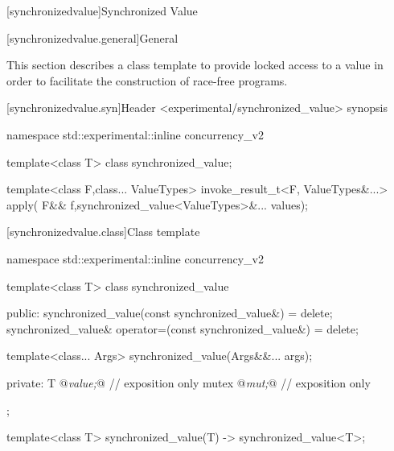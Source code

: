 \setcounter{chapter}{7}
[synchronizedvalue]{Synchronized Value}

[synchronizedvalue.general]{General}

This section describes a class template to provide locked access to a
value in order to facilitate the construction of race-free programs.

[synchronizedvalue.syn]{Header <experimental/synchronized_value> synopsis}

\begin{codeblock}
namespace std::experimental::inline concurrency_v2 {
    template<class T>
    class synchronized_value;

    template<class F,class... ValueTypes>
    invoke_result_t<F, ValueTypes&...> apply(
        F&& f,synchronized_value<ValueTypes>&... values);
}
\end{codeblock}

[synchronizedvalue.class]{Class template  }

\begin{codeblock}
namespace std::experimental::inline concurrency_v2 {
  template<class T>
    class synchronized_value
    {
    public:
        synchronized_value(const synchronized_value&) = delete;
        synchronized_value& operator=(const synchronized_value&) = delete;

        template<class... Args>
        synchronized_value(Args&&... args);

    private:
        T @\emph{value;}@   // exposition only
        mutex @\emph{mut;}@ // exposition only
    };

template<class T>
synchronized_value(T)
-> synchronized_value<T>;
}
\end{codeblock}

